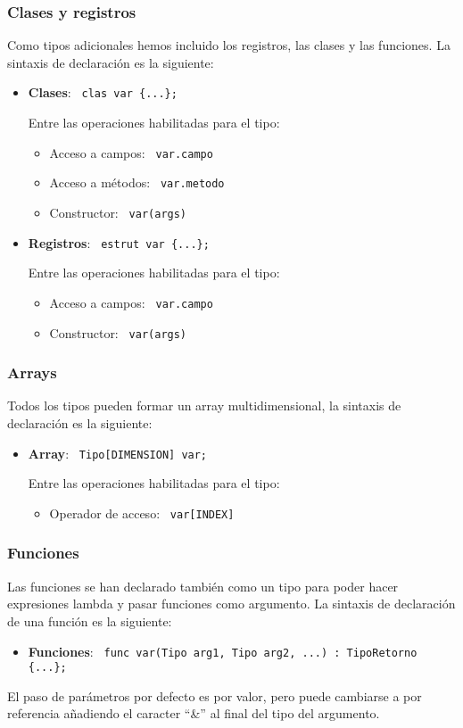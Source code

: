 \documentclass[10pt,a4paper]{article}
\begin{document}
\subsubsection{Clases y registros}
Como tipos adicionales hemos incluido los registros, las clases y las funciones. La sintaxis de declaración es la siguiente:
\begin{itemize}
    \item \textbf{Clases}: \texttt{\color{blue} clas var \{...\};}
    
    Entre las operaciones habilitadas para el tipo:
    \begin{itemize}
        \item Acceso a campos: \texttt{\color{blue} var.campo}
        \item Acceso a métodos: \texttt{\color{blue} var.metodo}
        \item Constructor: \texttt{\color{blue} var(args)}
    \end{itemize}
    \item \textbf{Registros}: \texttt{\color{blue} estrut var \{...\};}
    
    Entre las operaciones habilitadas para el tipo:
    \begin{itemize}
        \item Acceso a campos: \texttt{\color{blue} var.campo}
        \item Constructor: \texttt{\color{blue} var(args)}
    \end{itemize}
\end{itemize}


\subsubsection{Arrays}
Todos los tipos pueden formar un array multidimensional, la sintaxis de declaración es la siguiente:
\begin{itemize}
    \item \textbf{Array}: \texttt{\color{blue} Tipo[DIMENSION] var;}
    
    Entre las operaciones habilitadas para el tipo:
    \begin{itemize}
        \item Operador de acceso: \texttt{\color{blue} var[INDEX]}
    \end{itemize}
\end{itemize}



\subsubsection{Funciones}
Las funciones se han declarado también como un tipo para poder hacer expresiones lambda y pasar funciones como argumento. La sintaxis de declaración de una función es la siguiente:
\begin{itemize}
    \item \textbf{Funciones}: \texttt{\color{blue} func var(Tipo arg1, Tipo arg2, ...) : TipoRetorno \{...\};}
\end{itemize}
El paso de parámetros por defecto es por valor, pero puede cambiarse a por referencia añadiendo el caracter ``\&'' al final del tipo del argumento.
\end{document}
